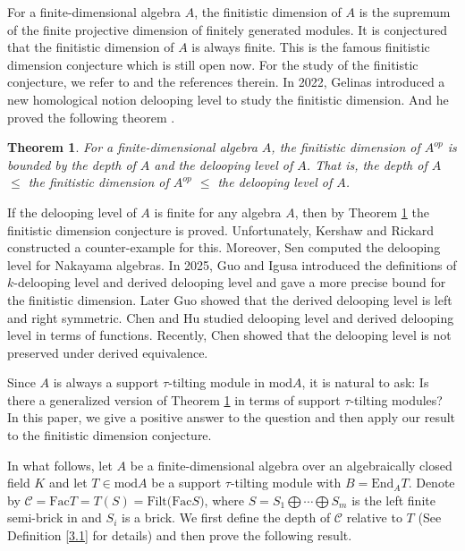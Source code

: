 \documentclass[a4paper]{amsart}
\newtheorem{thm}{Theorem}[section]
\theoremstyle{definition}
\theoremstyle{remark}
\numberwithin{equation}{section}
\begin{document}
For a finite-dimensional algebra $A$, the finitistic dimension of $A$ is the supremum of the finite projective dimension of finitely generated modules. It is conjectured that the finitistic dimension of $A$ is always finite. This is the famous finitistic dimension conjecture which is still open now. For the study of the finitistic conjecture, we refer to \cite{GPS, IT, K, PX, Xi2} and the references therein.  In 2022, Gelinas \cite{G} introduced a new homological notion delooping level to study the finitistic dimension. And he proved the following theorem \cite[Proposition 1.3]{G}.

 \begin{thm}\label{1.1} For a finite-dimensional algebra $A$, the finitistic dimension of $A^{op}$ is bounded by the depth of $A$ and the delooping level of $A$. That is, the depth of $A$ $\leq$ the finitistic dimension of $A^{op}$ $\leq$ the delooping level of $A$.
 \end{thm}

 If the delooping level of $A$ is finite for any algebra $A$, then by Theorem \ref{1.1} the finitistic dimension conjecture is proved. Unfortunately,  Kershaw and Rickard \cite{KR} constructed a counter-example for this. Moreover, Sen \cite{S} computed the delooping level for Nakayama algebras. In 2025, Guo and Igusa \cite{GuI} introduced the definitions of $k$-delooping level and derived delooping level and gave a more precise bound for the finitistic dimension. Later Guo \cite{Gu} showed that the derived delooping level is left and right symmetric. Chen and Hu \cite{CH} studied delooping level and derived delooping level in terms of functions. Recently, Chen \cite{C} showed that the delooping level is not preserved under derived equivalence.

Since $A$ is always a support $\tau$-tilting module in $\text{mod}A$, it is natural to ask: Is there a generalized version of Theorem \ref{1.1} in terms of support $\tau$-tilting modules? In this paper, we give a positive answer to the question and then apply our result to the finitistic dimension conjecture.

In what follows, let $A$ be a finite-dimensional algebra over an algebraically closed field $K$ and let $T\in \text{mod} A$ be a support $\tau$-tilting module with $B=\text{End}_A T$. Denote by $\mathcal{C}=\text{Fac}T=T(S)=\text{Filt(Fac} S)$, where $S=S_1\bigoplus \cdots \bigoplus S_m$ is the left finite semi-brick in \cite[Theorem 2.3(2)]{As} and $S_i$ is a brick. We first define the depth of $\mathcal{C}$ relative to $T$ (See Definition \ref{3.1} for details) and then prove the following result.
\end{document}
